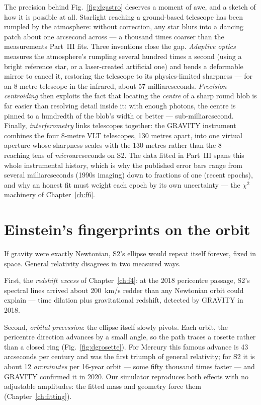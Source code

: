 The precision behind Fig.~\ref{fig:dgastro} deserves a moment of awe,
and a sketch of how it is possible at all. Starlight reaching a
ground-based telescope has been rumpled by the atmosphere: without
correction, any star blurs into a dancing patch about one arcsecond
across — a thousand times coarser than the measurements Part~III
fits. Three inventions close the gap. \emph{Adaptive optics} measures
the atmosphere's rumpling several hundred times a second (using a
bright reference star, or a laser-created artificial one) and bends a
deformable mirror to cancel it, restoring the telescope to its
physics-limited sharpness — for an 8-metre telescope in the
infrared, about 57 milliarcseconds. \emph{Precision centroiding} then
exploits the fact that locating the \emph{centre} of a sharp round
blob is far easier than resolving detail inside it: with enough
photons, the centre is pinned to a hundredth of the blob's width or
better — sub-milliarcsecond. Finally, \emph{interferometry} links
telescopes together: the GRAVITY instrument combines the four 8-metre
VLT telescopes, 130 metres apart, into one virtual aperture whose
sharpness scales with the 130 metres rather than the 8 — reaching
tens of \emph{micro}arcseconds on S2. The data fitted in Part~III
spans this whole instrumental history, which is why the published
error bars range from several milliarcseconds (1990s imaging) down to
fractions of one (recent epochs), and why an honest fit must weight
each epoch by its own uncertainty — the $\chi^2$ machinery of
Chapter~\ref{ch:f6}.

\section{Einstein's fingerprints on the orbit}

If gravity were exactly Newtonian, S2's ellipse would repeat itself
forever, fixed in space. General relativity disagrees in two measured
ways.

First, the \emph{redshift excess} of Chapter~\ref{ch:f4}: at the 2018
pericentre passage, S2's spectral lines arrived about 200~km/s redder
than any Newtonian orbit could explain — time dilation plus
gravitational redshift, detected by GRAVITY in 2018.

Second, \emph{orbital precession}: the ellipse itself slowly pivots. Each
orbit, the pericentre direction advances by a small angle, so the path
traces a rosette rather than a closed ring (Fig.~\ref{fig:dgrosette}).
For Mercury this famous advance is 43 arcseconds per century and was the
first triumph of general relativity; for S2 it is about 12
\emph{arcminutes} per 16-year orbit — some fifty thousand times faster —
and GRAVITY confirmed it in 2020. Our simulator reproduces both effects
with no adjustable amplitudes: the fitted mass and geometry force them
(Chapter~\ref{ch:fitting}).

